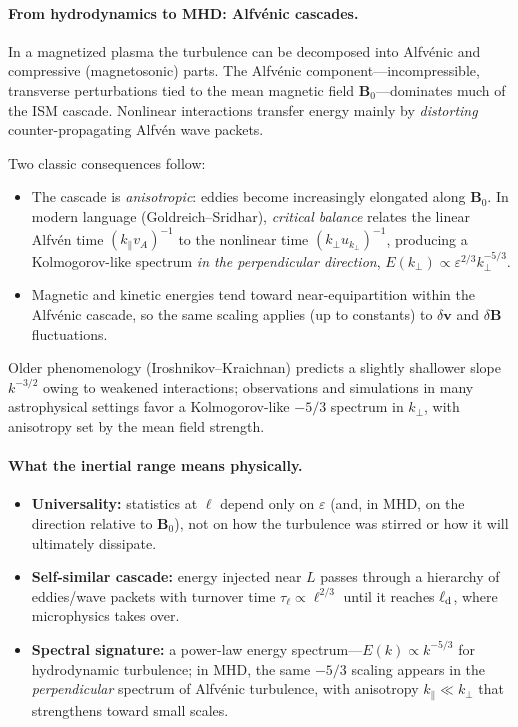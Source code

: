 \paragraph{From hydrodynamics to MHD: Alfv\'enic cascades.}
In a magnetized plasma the turbulence can be decomposed into Alfvénic and compressive (magnetosonic) parts. The Alfvénic component---incompressible, transverse perturbations tied to the mean magnetic field \(\mathbf B_0\)---dominates much of the ISM cascade. Nonlinear interactions transfer energy mainly by \emph{distorting} counter-propagating Alfvén wave packets. 

Two classic consequences follow:
\begin{itemize}
  \item The cascade is \emph{anisotropic}: eddies become increasingly elongated along \(\mathbf B_0\). In modern language (Goldreich–Sridhar), \emph{critical balance} relates the linear Alfvén time \( (k_\parallel v_A)^{-1} \) to the nonlinear time \( (k_\perp u_{k_\perp})^{-1} \), producing a Kolmogorov-like spectrum \emph{in the perpendicular direction}, \(E(k_\perp)\propto \varepsilon^{2/3}k_\perp^{-5/3}\).
  \item Magnetic and kinetic energies tend toward near-equipartition within the Alfvénic cascade, so the same scaling applies (up to constants) to \(\delta\mathbf v\) and \(\delta\mathbf B\) fluctuations.
\end{itemize}
Older phenomenology (Iroshnikov–Kraichnan) predicts a slightly shallower slope \(k^{-3/2}\) owing to weakened interactions; observations and simulations in many astrophysical settings favor a Kolmogorov-like \(-5/3\) spectrum in \(k_\perp\), with anisotropy set by the mean field strength.

\paragraph{What the inertial range means physically.}
\begin{itemize}
  \item \textbf{Universality:} statistics at \(\ell\) depend only on \(\varepsilon\) (and, in MHD, on the direction relative to \(\mathbf B_0\)), not on how the turbulence was stirred or how it will ultimately dissipate.
  \item \textbf{Self-similar cascade:} energy injected near \(L\) passes through a hierarchy of eddies/wave packets with turnover time \(\tau_\ell\propto \ell^{2/3}\) until it reaches \(\ell_{\rm d}\), where microphysics takes over.
  \item \textbf{Spectral signature:} a power-law energy spectrum—\(E(k)\propto k^{-5/3}\) for hydrodynamic turbulence; in MHD, the same \(-5/3\) scaling appears in the \emph{perpendicular} spectrum of Alfvénic turbulence, with anisotropy \(k_\parallel \ll k_\perp\) that strengthens toward small scales.
\end{itemize}

